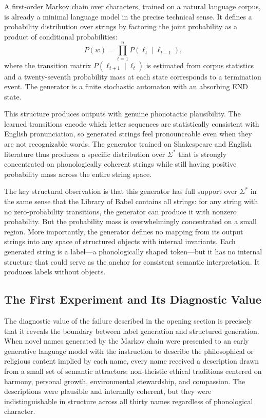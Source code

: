 \documentclass[12pt, a4paper]{article}
\theoremstyle{plain}
\theoremstyle{definition}
\theoremstyle{remark}
\begin{document}
A first-order Markov chain over characters, trained on a natural language corpus, is already a minimal language model in the precise technical sense. It defines a probability distribution over strings by factoring the joint probability as a product of conditional probabilities:
\[
P(w) = \prod_{t=1}^{n} P(\ell_t \mid \ell_{t-1}),
\]
where the transition matrix $P(\ell_{t+1} \mid \ell_t)$ is estimated from corpus statistics and a twenty-seventh probability mass at each state corresponds to a termination event. The generator is a finite stochastic automaton with an absorbing END state.

This structure produces outputs with genuine phonotactic plausibility. The learned transitions encode which letter sequences are statistically consistent with English pronunciation, so generated strings feel pronounceable even when they are not recognizable words. The generator trained on Shakespeare and English literature thus produces a specific distribution over $\Sigma^*$ that is strongly concentrated on phonologically coherent strings while still having positive probability mass across the entire string space.

The key structural observation is that this generator has full support over $\Sigma^*$ in the same sense that the Library of Babel contains all strings: for any string with no zero-probability transitions, the generator can produce it with nonzero probability. But the probability mass is overwhelmingly concentrated on a small region. More importantly, the generator defines no mapping from its output strings into any space of structured objects with internal invariants. Each generated string is a label---a phonologically shaped token---but it has no internal structure that could serve as the anchor for consistent semantic interpretation. It produces labels without objects.

\subsection{The First Experiment and Its Diagnostic Value}

The diagnostic value of the failure described in the opening section is precisely that it reveals the boundary between label generation and structured generation. When novel names generated by the Markov chain were presented to an early generative language model with the instruction to describe the philosophical or religious content implied by each name, every name received a description drawn from a small set of semantic attractors: non-theistic ethical traditions centered on harmony, personal growth, environmental stewardship, and compassion. The descriptions were plausible and internally coherent, but they were indistinguishable in structure across all thirty names regardless of phonological character.
\end{document}
